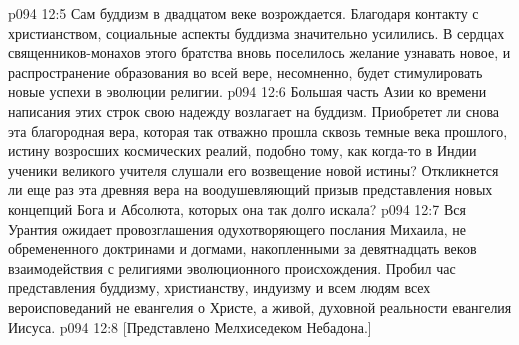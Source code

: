 \vs p094 12:5 Сам буддизм в двадцатом веке возрождается. Благодаря контакту с христианством, социальные аспекты буддизма значительно усилились. В сердцах священников\hyp{}монахов этого братства вновь поселилось желание узнавать новое, и распространение образования во всей вере, несомненно, будет стимулировать новые успехи в эволюции религии.
\vs p094 12:6 Большая часть Азии ко времени написания этих строк свою надежду возлагает на буддизм. Приобретет ли снова эта благородная вера, которая так отважно прошла сквозь темные века прошлого, истину возросших космических реалий, подобно тому, как когда\hyp{}то в Индии ученики великого учителя слушали его возвещение новой истины? Откликнется ли еще раз эта древняя вера на воодушевляющий призыв представления новых концепций Бога и Абсолюта, которых она так долго искала?
\vs p094 12:7 \pc Вся Урантия ожидает провозглашения одухотворяющего послания Михаила, не обремененного доктринами и догмами, накопленными за девятнадцать веков взаимодействия с религиями эволюционного происхождения. Пробил час представления буддизму, христианству, индуизму и всем людям всех вероисповеданий не евангелия о Христе, а живой, духовной реальности евангелия Иисуса.
\vsetoff
\vs p094 12:8 [Представлено Мелхиседеком Небадона.]

